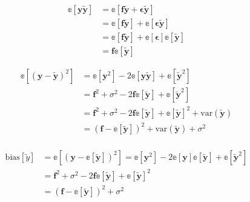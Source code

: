 \documentclass[twoside,11pt]{report}
\begin{document}
\begin{align*}
\mathbb{e}[\mathbf{y\tilde{y}}] & = \mathbb{e}[\mathbf{f\tilde{y}} + \mathbf{\epsilon\tilde{y}}]\\
& = \mathbb{e}[\mathbf{f\tilde{y}}] + \mathbb{e}[\mathbf{\epsilon\tilde{y}}]\\
& = \mathbb{e}[\mathbf{f\tilde{y}}] + \mathbb{e}[\mathbf{\epsilon}]\mathbb{e}[\mathbf{\tilde{y}}]\\
& = \mathbf{f}\mathbb{e}[\mathbf{\tilde{y}}]
\end{align*}


\begin{align*}
\mathbb{e}\left[(\mathbf{y}-\mathbf{\tilde{y}})^2\right] & = \mathbb{e}[\mathbf{y}^2] - 2\mathbb{e}[\mathbf{y\tilde{y}}] + \mathbb{e}[\mathbf{\tilde{y}}^2]\\
& = \mathbf{f}^2 + \sigma^2 - 2\mathbf{f}\mathbb{e}[\mathbf{\tilde{y}}] + \mathbb{e}[\mathbf{\tilde{y}}^2]\\
& = \mathbf{f}^2 + \sigma^2 - 2\mathbf{f}\mathbb{e}[\mathbf{\tilde{y}}] + \mathbb{e}[\mathbf{\tilde{y}}]^2 + \text{var}(\mathbf{\tilde{y}})\\
& = (\mathbf{f} - \mathbb{e}[\mathbf{\tilde{y}}])^2 + \text{var}(\mathbf{\tilde{y}}) + \sigma^2\\
\end{align*}


\begin{align*}
\mathrm{bias}[\tilde{y}]& =\mathbb{e}\left[\left(\mathbf{y}-\mathbb{e}\left[\mathbf{\tilde{y}}\right]\right)^2\right] = \mathbb{e}[\mathbf{y}^2] - 2\mathbb{e}[\mathbf{y}]\mathbb{e}[\mathbf{\tilde{y}}] + \mathbb{e}[\mathbf{\tilde{y}}^2]\\
& = \mathbf{f}^2 + \sigma^2 - 2\mathbf{f}\mathbb{e}[\mathbf{\tilde{y}}] + \mathbb{e}[\mathbf{\tilde{y}}]^2\\
& = (\mathbf{f} - \mathbb{e}[\mathbf{\tilde{y}}])^2 + \sigma^2\\
\end{align*}
\end{document}
